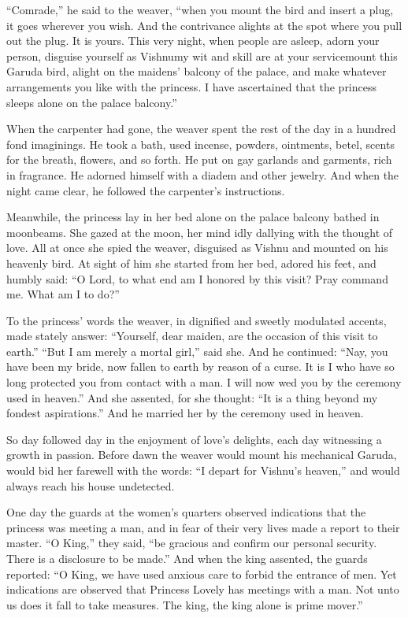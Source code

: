 \documentclass[article, twoside, 14pt]{memoir}
\begin{document}
``Comrade,'' he said to the weaver,
``when you mount the bird and insert a plug, it goes wherever you wish. And the contrivance alights at the spot where you pull out the plug. It is yours. This very night, when people are asleep, adorn your person, disguise yourself as Vishnu{\textemdash}my wit and skill are at your service{\textemdash}mount this Garuda bird, alight on the maidens' balcony of the palace, and make whatever arrangements you like with the princess. I have ascertained that the princess sleeps alone on the palace balcony.''

When the carpenter had gone, the weaver spent the rest of the day
in a hundred fond imaginings. He took a bath, used incense,
powders, ointments, betel, scents for the breath, flowers, and so
forth. He put on gay garlands and garments, rich in fragrance. He
adorned himself with a diadem and other jewelry. And when the night
came clear, he followed the carpenter's instructions.

Meanwhile, the princess lay in her bed alone on the palace balcony
bathed in moonbeams. She gazed at the moon, her mind idly dallying
with the thought of love. All at once she spied the weaver,
disguised as Vishnu and mounted on his heavenly bird. At sight of
him she started from her bed, adored his feet, and humbly said:
``O Lord, to what end am I honored by this visit? Pray command me. What am I to do?''

To the princess' words the weaver, in dignified and sweetly
modulated accents, made stately answer:
``Yourself, dear maiden, are the occasion of this visit to earth.''
``But I am merely a mortal girl,'' said she. And he continued:
``Nay, you have been my bride, now fallen to earth by reason of a curse. It is I who have so long protected you from contact with a man. I will now wed you by the ceremony used in heaven.''
And she assented, for she thought:
``It is a thing beyond my fondest aspirations.'' And he
married her by the ceremony used in heaven.

So day followed day in the enjoyment of love's delights, each day
witnessing a growth in passion. Before dawn the weaver would mount
his mechanical Garuda, would bid her farewell with the words:
``I depart for Vishnu's heaven,'' and would always reach his house
undetected.

One day the guards at the women's quarters observed indications
that the princess was meeting a man, and in fear of their very
lives made a report to their master. ``O King,'' they said,
``be gracious and confirm our personal security. There is a disclosure to be made.''
And when the king assented, the guards reported:
``O King, we have used anxious care to forbid the entrance of men. Yet indications are observed that Princess Lovely has meetings with a man. Not unto us does it fall to take measures. The king, the king alone is prime mover.''
\end{document}
